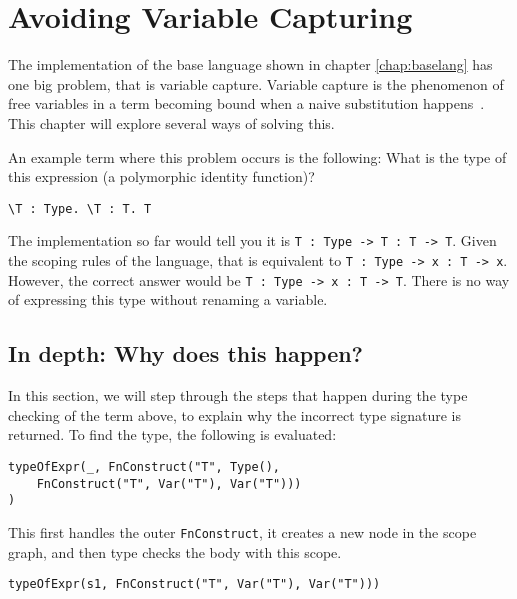 
\chapter{\label{chap:namecolls}Avoiding Variable Capturing}

The implementation of the base language shown in chapter \ref{chap:baselang} has one big problem, that is variable capture. Variable capture is the phenomenon of free variables in a term becoming bound when a naive substitution happens~\cite{tapl}. This chapter will explore several ways of solving this. 

An example term where this problem occurs is the following: What is the type of this expression (a polymorphic identity function)?
\begin{lstlisting}
\T : Type. \T : T. T
\end{lstlisting}
The implementation so far would tell you it is \verb|T : Type -> T : T -> T|. Given the scoping rules of the language, that is equivalent to \verb|T : Type -> x : T -> x|. However, the correct answer would be \verb|T : Type -> x : T -> T|. There is no way of expressing this type without renaming a variable.

\section{In depth: Why does this happen?}

In this section, we will step through the steps that happen during the type checking of the term above, to explain why the incorrect type signature is returned. To find the type, the following is evaluated:

\begin{lstlisting}
typeOfExpr(_, FnConstruct("T", Type(), 
    FnConstruct("T", Var("T"), Var("T")))
)
\end{lstlisting}

\noindent
This first handles the outer \verb|FnConstruct|, it creates a new node in the scope graph, and then type checks the body with this scope.

\begin{lstlisting}
typeOfExpr(s1, FnConstruct("T", Var("T"), Var("T")))
\end{lstlisting}


